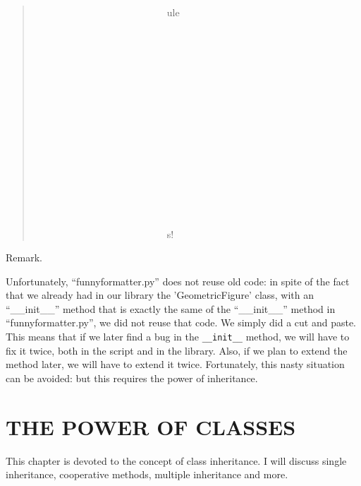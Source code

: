 \documentclass[10pt,english]{article}
\begin{document}
\begin{quote}
\begin{ttfamily}
\begin{flushleft}
\mbox{~~~~~~~~~~~~~~~~~~~~~~~~~~~ule~~~~~~~~~~~~~~~~~~~~~~~~~~~~~~~~~~~~~~}\\
\mbox{~~~~~~~~~~~~~~~~~~~~~~~~~~~~~~~~~~~~~~~~~~~~~~~~~~~~~~~~~~~~~~~~~~~~}\\
\mbox{~~~~~~~~~~~~~~~~~~~~~~~~~~~~~~~~~~~~~~~~~~~~~~~~~~~~~~~~~~~~~~~~~~~~}\\
\mbox{~~~~~~~~~~~~~~~~~~~~~~~~~~~~~~~~~~~~~~~~~~~~~~~~~~~~~~~~~~~~~~~~~~~~}\\
\mbox{~~~~~~~~~~~~~~~~~~~~~~~~~~~~~~~~~~~~~~~~~~~~~~~~~~~~~~~~~~~~~~~~~~~~}\\
\mbox{~~~~~~~~~~~~~~~~~~~~~~~~~~~~~~~~~~~~~~~~~~~~~~~~~~~~~~~~~~~~~~~~~~~~}\\
\mbox{~~~~~~~~~~~~~~~~~~~~~~~~~~~~~~~~~~~~~~~~~~~~~~~~~~~~~~~~~~~~~~~~~~~~}\\
\mbox{~~~~~~~~~~~~~~~~~~~~~~~~~~~~~~~~~~~~~~~~~~~~~~~~~~~~~~~~~~~~~~~~~~~~}\\
\mbox{~~~~~~~~~~~~~~~~~~~~~~~~~~~s!}
\end{flushleft}\end{ttfamily}
\end{quote}

Remark.

Unfortunately, ``funnyformatter.py'' does not reuse old code: in spite of the
fact that we already had in our library the 'GeometricFigure' class, with 
an ``{\_}{\_}init{\_}{\_}'' method that is exactly the same of the ``{\_}{\_}init{\_}{\_}'' method in 
``funnyformatter.py'', we did not reuse that code. We simply did a cut
and paste. This means that if we later find a bug in the \texttt{{\_}{\_}init{\_}{\_}} method,
we will have to fix it twice, both in the script and in the library. Also,
if we plan to extend the method later, we will have to extend it twice.
Fortunately, this nasty situation can be avoided: but this requires the
power of inheritance.



\hypertarget{the-power-of-classes}{}
\section*{THE POWER OF CLASSES}

This chapter is devoted to the concept of class inheritance. I will discuss
single inheritance, cooperative methods, multiple inheritance and more.


\end{document}
